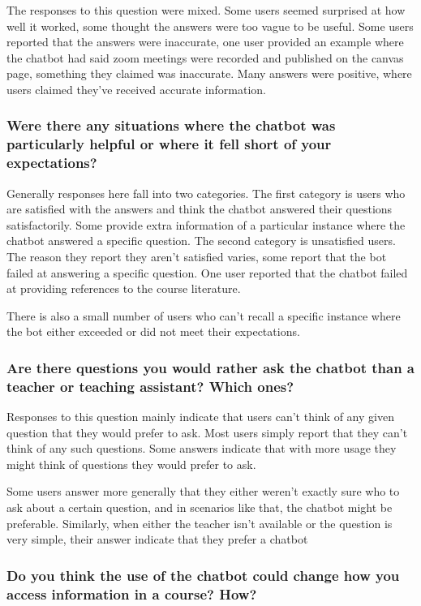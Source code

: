 The responses to this question were mixed. Some users seemed surprised at how well it worked, some thought the answers were too vague to be useful. Some users reported that the answers were inaccurate, one user provided an example where the chatbot had said zoom meetings were recorded and published on the canvas page, something they claimed was inaccurate. Many answers were positive, where users claimed they’ve received accurate information.


\subsubsection{Were there any situations where the chatbot was particularly helpful or where it fell short of your expectations?}


Generally responses here fall into two categories. The first category is users who are satisfied with the answers and think the chatbot answered their questions satisfactorily. Some provide extra information of a particular instance where the chatbot answered a specific question. The second category is unsatisfied users. The reason they report they aren’t satisfied varies, some report that the bot failed at answering a specific question. One user reported that the chatbot failed at providing references to the course literature.


There is also a small number of users who can’t recall a specific instance where the bot either exceeded or did not meet their expectations.


\subsubsection{Are there questions you would rather ask the chatbot than a teacher or teaching assistant? Which ones?}


Responses to this question mainly indicate that users can’t think of any given question that they would prefer to ask. Most users simply report that they can’t think of any such questions. Some answers indicate that with more usage they might think of questions they would prefer to ask.


Some users answer more generally that they either weren't exactly sure who to ask about a certain question, and in scenarios like that, the chatbot might be preferable. Similarly, when either the teacher isn’t available or the question is very simple, their answer indicate that they prefer a chatbot


\subsubsection{Do you think the use of the chatbot could change how you access information in a course? How?}


